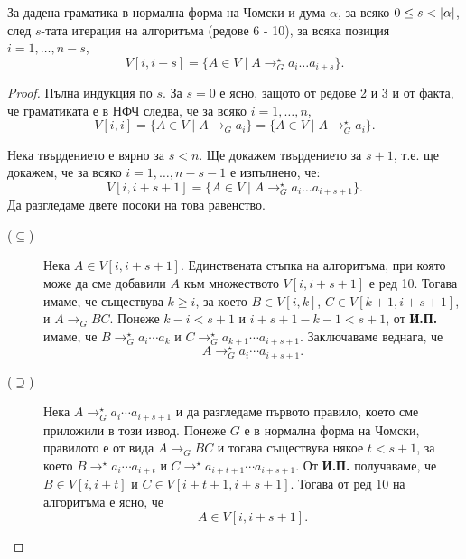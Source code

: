 \begin{lemma}
  За дадена граматика в нормална форма на Чомски и дума $\alpha$, 
  за всяко $0 \leq s < \vert{\alpha}\vert$, след $s$-тата итерация на алгоритъма (редове 6 - 10), за всяка позиция $i = 1,\dots,n-s$,
  \[V[i,i+s] = \{A \in V \mid A \rightarrow^\star_G a_i\dots a_{i+s}\}.\]
\end{lemma}
\begin{proof}
  Пълна индукция по $s$.
  За $s = 0$ е ясно, защото от редове 2 и 3 и от факта, че граматиката е в НФЧ следва, че за всяко $i = 1, \dots, n$,
  \[V[i,i] = \{A \in V \mid A \to_G a_i\} = \{A \in V \mid A \to^\star_G a_i\}.\]

  Нека твърдението е вярно за $s < n$. Ще докажем твърдението за $s+1$, т.е. ще докажем, че за всяко $i = 1,\dots,n-s-1$
  е изпълнено, че:
  \[V[i,i+s+1] = \{A \in V \mid A \rightarrow^\star_G a_i\dots a_{i+s+1}\}.\]
  Да разгледаме двете посоки на това равенство.
  \begin{description}
  \item[($\subseteq$)]
    Нека $A \in V[i,i+s+1]$.
    Единствената стъпка на алгоритъма, при която може да сме добавили $A$ към множеството $V[i,i+s+1]$ е ред 10.
    Тогава имаме, че съществува $k \geq i$, за което $B \in V[i,k]$, $C \in V[k+1,i+s+1]$, и $A\to_G BC$.
    Понеже $k-i < s+1$ и $i+s+1 - k - 1 < s+1$, от {\bf И.П.} имаме, че $B \to^\star_G a_i\cdots a_k$ и $C \to^\star_G a_{k+1}\cdots a_{i+s+1}$.
    Заключаваме веднага, че 
    \[A \to^\star_G a_i\cdots a_{i+s+1}.\]
  \item[($\supseteq$)]
    Нека $A \to^\star_G a_i\cdots a_{i+s+1}$ и да разгледаме първото правило, което сме приложили в този извод.
    Понеже $G$ е в нормална форма на Чомски, правилото е от вида $A \to_G BC$ и тогава съществува някое $t < s+1$, за което 
    $B \to^\star a_i\cdots a_{i+t}$ и $C \to^\star a_{i+t+1}\cdots a_{i+s+1}$.
    От {\bf И.П.} получаваме, че $B \in V[i,i+t]$ и $C \in V[i+t+1,i+s+1]$.
    Тогава от ред 10 на алгоритъма е ясно, че 
    \[A \in V[i,i+s+1].\]
  \end{description}
\end{proof}


